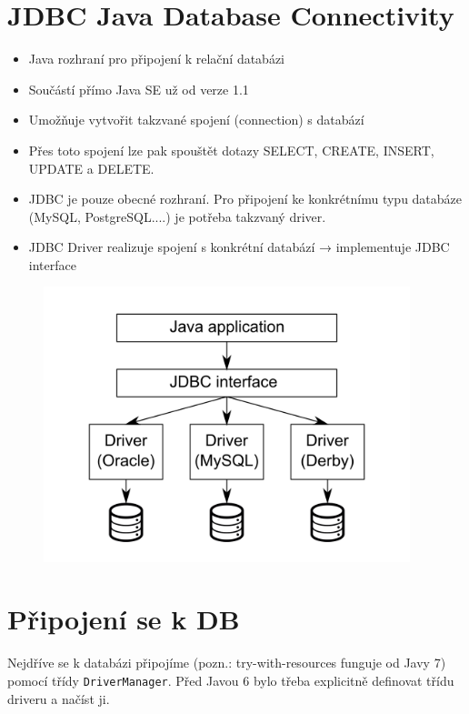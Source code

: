 \documentclass{szzclass}
\begin{document}
\tableofcontents
\newpage

\section{JDBC Java Database Connectivity}
\begin{itemize}
\item Java rozhraní pro připojení k relační databázi
\item Součástí přímo Java SE už od verze 1.1
\item Umožňuje vytvořit takzvané spojení (connection) s databází
\item Přes toto spojení lze pak spouštět dotazy SELECT, CREATE, INSERT, UPDATE a DELETE.
\item JDBC je pouze obecné rozhraní. Pro připojení ke konkrétnímu typu databáze (MySQL, PostgreSQL....) je potřeba takzvaný driver.
\item JDBC Driver realizuje spojení s konkrétní databází → implementuje JDBC interface
\end{itemize}
\begin{figure}[h!]
\includegraphics[width=0.95\textwidth]{topics/bi-wsi-si-28/images/image1.png}
\end{figure}

\section{Připojení se k DB}
Nejdříve se k databázi připojíme (pozn.: try-with-resources funguje od Javy 7) pomocí třídy \texttt{DriverManager}. Před Javou 6 bylo třeba explicitně definovat třídu driveru a načíst ji.
\end{document}
